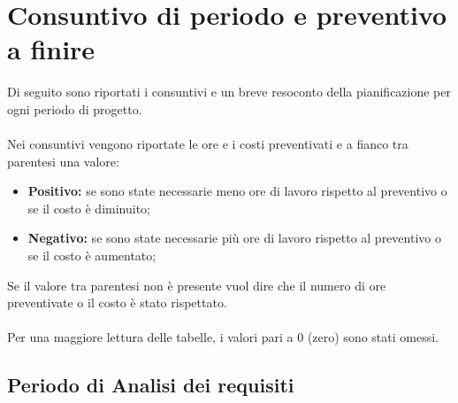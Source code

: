 \documentclass[PianoDiProgetto.tex]{subfiles}
\begin{document}
\chapter{Consuntivo di periodo e preventivo a finire}
Di seguito sono riportati i consuntivi e un breve resoconto della pianificazione per ogni periodo di progetto.\\\\
Nei consuntivi vengono riportate le ore e i costi preventivati e a fianco tra parentesi una valore: 
\begin{itemize}
	\item \textbf{Positivo:} se sono state necessarie meno ore di lavoro rispetto al preventivo o se il costo è diminuito;
	\item \textbf{Negativo:} se sono state necessarie più ore di lavoro rispetto al preventivo o se il costo è aumentato;
\end{itemize}
Se il valore tra parentesi non è presente vuol dire che il numero di ore preventivate o il costo è stato rispettato.\\\\
Per una maggiore lettura delle tabelle, i valori pari a 0 (zero) sono stati omessi.

\newpage
\section{Periodo di Analisi dei requisiti}
\end{document}
